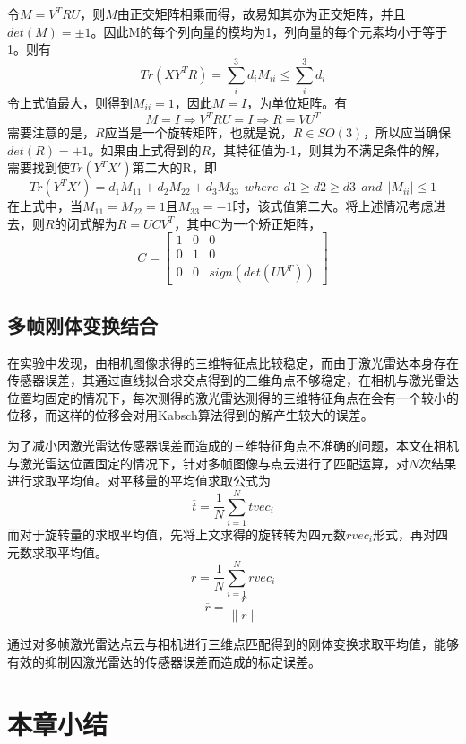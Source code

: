 令$M=V^TRU$，则$M$由正交矩阵相乘而得，故易知其亦为正交矩阵，并且$det(M)=\pm 1$。因此M的每个列向量的模均为1，列向量的每个元素均小于等于1。则有
\begin{equation}
    Tr(XY^TR)=\sum_i^3{d_i M_{ii}} \leq \sum_i^3{d_i}
\end{equation}
令上式值最大，则得到$M_{ii}=1$，因此$M=I$，为单位矩阵。有
\begin{equation}
    M=I\Rightarrow V^TRU=I \Rightarrow R=VU^T
\end{equation}
需要注意的是，$R$应当是一个旋转矩阵，也就是说，$R \in SO(3)$，所以应当确保 $det(R)=+1$。如果由上式得到的$R$，其特征值为-1，则其为不满足条件的解，需要找到使$Tr(Y^TX')$第二大的R，即
\begin{equation}
    Tr(Y^TX')=d_1M_{11}+d_2M_{22}+d_3M_{33}\ \ where\ \ d1\geq d2 \geq d3 \ \ and\ \ |M_{ii}| \leq 1
\end{equation}
在上式中，当$M_{11}=M_{22}=1$且$M_{33}=-1$时，该式值第二大。将上述情况考虑进去，则$R$的闭式解为$R=UCV^T$，其中C为一个矫正矩阵，
$$
C=\begin{bmatrix} 1&0&0 \\ 0&1&0 \\ 0&0&sign(det(UV^T))
\end{bmatrix}
$$

\subsection{多帧刚体变换结合}
在实验中发现，由相机图像求得的三维特征点比较稳定，而由于激光雷达本身存在传感器误差，其通过直线拟合求交点得到的三维角点不够稳定，在相机与激光雷达位置均固定的情况下，每次测得的激光雷达测得的三维特征角点在会有一个较小的位移，而这样的位移会对用Kabsch算法得到的解产生较大的误差。

为了减小因激光雷达传感器误差而造成的三维特征角点不准确的问题，本文在相机与激光雷达位置固定的情况下，针对多帧图像与点云进行了匹配运算，对$N$次结果进行求取平均值。对平移量的平均值求取公式为
$$\overline{t}=\frac{1}{N}\sum_{i=1}^N{{tvec}_i}$$
而对于旋转量的求取平均值，先将上文求得的旋转转为四元数${rvec}_i$形式，再对四元数求取平均值。
$$r=\frac{1}{N}\sum_{i=1}^N{{rvec}_i}$$
$$\overline{r}=\frac{r}{\|r\|}$$

通过对多帧激光雷达点云与相机进行三维点匹配得到的刚体变换求取平均值，能够有效的抑制因激光雷达的传感器误差而造成的标定误差。

\section{本章小结}

